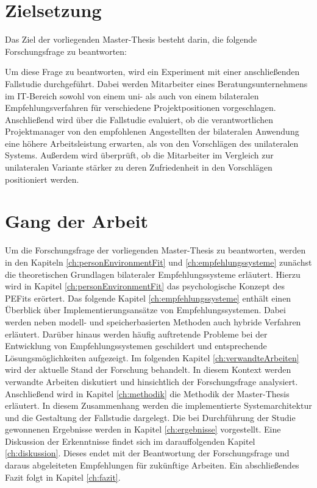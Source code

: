 \newpage
\section{Zielsetzung}
\label{sec:intro:zielsetzung}
Das Ziel der vorliegenden Master-Thesis besteht darin, die folgende Forschungsfrage zu beantworten:

\forschungsfrage

Um diese Frage zu beantworten, wird ein Experiment mit einer anschließenden Fallstudie durchgeführt. Dabei werden Mitarbeiter eines Beratungsunternehmens im IT-Bereich sowohl von einem uni- als auch von einem bilateralen Empfehlungsverfahren für verschiedene Projektpositionen vorgeschlagen. Anschließend wird über die Fallstudie evaluiert, ob die verantwortlichen Projektmanager von den empfohlenen Angestellten der bilateralen Anwendung eine höhere Arbeitsleistung erwarten, als von den Vorschlägen des unilateralen Systems. Außerdem wird überprüft, ob die Mitarbeiter im Vergleich zur unilateralen Variante stärker zu deren Zufriedenheit in den Vorschlägen positioniert werden.

\section{Gang der Arbeit}
\label{sec:intro:gangDerArbeit}
Um die Forschungsfrage der vorliegenden Master-Thesis zu beantworten, werden in den Kapiteln \ref{ch:personEnvironmentFit} und \ref{ch:empfehlungssysteme} zunächst die theoretischen Grundlagen bilateraler Empfehlungssysteme erläutert. Hierzu wird in Kapitel \ref{ch:personEnvironmentFit} das psychologische Konzept des \acp{PEFit} erörtert. Das folgende Kapitel \ref{ch:empfehlungssysteme} enthält einen Überblick über Implementierungsansätze von Empfehlungssystemen. Dabei werden neben modell- und speicherbasierten Methoden auch hybride Verfahren erläutert. Darüber hinaus werden häufig auftretende Probleme bei der Entwicklung von Empfehlungssystemen geschildert und entsprechende Lösungsmöglichkeiten aufgezeigt. Im folgenden Kapitel \ref{ch:verwandteArbeiten} wird der aktuelle Stand der Forschung behandelt. In diesem Kontext werden verwandte Arbeiten diskutiert und hinsichtlich der Forschungsfrage analysiert. Anschließend wird in Kapitel \ref{ch:methodik} die Methodik der Master-Thesis erläutert. In diesem Zusammenhang werden die implementierte Systemarchitektur und die Gestaltung der Fallstudie dargelegt. Die bei Durchführung der Studie gewonnenen Ergebnisse werden in Kapitel \ref{ch:ergebnisse} vorgestellt. Eine Diskussion der Erkenntnisse findet sich im darauffolgenden Kapitel \ref{ch:diskussion}. Dieses endet mit der Beantwortung der Forschungsfrage und daraus abgeleiteten Empfehlungen für zukünftige Arbeiten. Ein abschließendes Fazit folgt in Kapitel \ref{ch:fazit}.
